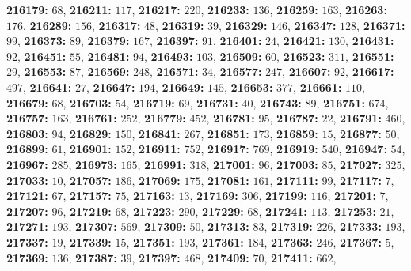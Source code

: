 \textsf{\bfseries 216179:} $68$, \textsf{\bfseries 216211:} $117$, \textsf{\bfseries 216217:} $220$, \textsf{\bfseries 216233:} $136$, \textsf{\bfseries 216259:} $163$, \textsf{\bfseries 216263:} $176$, \textsf{\bfseries 216289:} $156$, \textsf{\bfseries 216317:} $48$, \textsf{\bfseries 216319:} $39$, \textsf{\bfseries 216329:} $146$, \textsf{\bfseries 216347:} $128$, \textsf{\bfseries 216371:} $99$, \textsf{\bfseries 216373:} $89$, \textsf{\bfseries 216379:} $167$, \textsf{\bfseries 216397:} $91$, \textsf{\bfseries 216401:} $24$, \textsf{\bfseries 216421:} $130$, \textsf{\bfseries 216431:} $92$, \textsf{\bfseries 216451:} $55$, \textsf{\bfseries 216481:} $94$, \textsf{\bfseries 216493:} $103$, \textsf{\bfseries 216509:} $60$, \textsf{\bfseries 216523:} $311$, \textsf{\bfseries 216551:} $29$, \textsf{\bfseries 216553:} $87$, \textsf{\bfseries 216569:} $248$, \textsf{\bfseries 216571:} $34$, \textsf{\bfseries 216577:} $247$, \textsf{\bfseries 216607:} $92$, \textsf{\bfseries 216617:} $497$, \textsf{\bfseries 216641:} $27$, \textsf{\bfseries 216647:} $194$, \textsf{\bfseries 216649:} $145$, \textsf{\bfseries 216653:} $377$, \textsf{\bfseries 216661:} $110$, \textsf{\bfseries 216679:} $68$, \textsf{\bfseries 216703:} $54$, \textsf{\bfseries 216719:} $69$, \textsf{\bfseries 216731:} $40$, \textsf{\bfseries 216743:} $89$, \textsf{\bfseries 216751:} $674$, \textsf{\bfseries 216757:} $163$, \textsf{\bfseries 216761:} $252$, \textsf{\bfseries 216779:} $452$, \textsf{\bfseries 216781:} $95$, \textsf{\bfseries 216787:} $22$, \textsf{\bfseries 216791:} $460$, \textsf{\bfseries 216803:} $94$, \textsf{\bfseries 216829:} $150$, \textsf{\bfseries 216841:} $267$, \textsf{\bfseries 216851:} $173$, \textsf{\bfseries 216859:} $15$, \textsf{\bfseries 216877:} $50$, \textsf{\bfseries 216899:} $61$, \textsf{\bfseries 216901:} $152$, \textsf{\bfseries 216911:} $752$, \textsf{\bfseries 216917:} $769$, \textsf{\bfseries 216919:} $540$, \textsf{\bfseries 216947:} $54$, \textsf{\bfseries 216967:} $285$, \textsf{\bfseries 216973:} $165$, \textsf{\bfseries 216991:} $318$, \textsf{\bfseries 217001:} $96$, \textsf{\bfseries 217003:} $85$, \textsf{\bfseries 217027:} $325$, \textsf{\bfseries 217033:} $10$, \textsf{\bfseries 217057:} $186$, \textsf{\bfseries 217069:} $175$, \textsf{\bfseries 217081:} $161$, \textsf{\bfseries 217111:} $99$, \textsf{\bfseries 217117:} $7$, \textsf{\bfseries 217121:} $67$, \textsf{\bfseries 217157:} $75$, \textsf{\bfseries 217163:} $13$, \textsf{\bfseries 217169:} $306$, \textsf{\bfseries 217199:} $116$, \textsf{\bfseries 217201:} $7$, \textsf{\bfseries 217207:} $96$, \textsf{\bfseries 217219:} $68$, \textsf{\bfseries 217223:} $290$, \textsf{\bfseries 217229:} $68$, \textsf{\bfseries 217241:} $113$, \textsf{\bfseries 217253:} $21$, \textsf{\bfseries 217271:} $193$, \textsf{\bfseries 217307:} $569$, \textsf{\bfseries 217309:} $50$, \textsf{\bfseries 217313:} $83$, \textsf{\bfseries 217319:} $226$, \textsf{\bfseries 217333:} $193$, \textsf{\bfseries 217337:} $19$, \textsf{\bfseries 217339:} $15$, \textsf{\bfseries 217351:} $193$, \textsf{\bfseries 217361:} $184$, \textsf{\bfseries 217363:} $246$, \textsf{\bfseries 217367:} $5$, \textsf{\bfseries 217369:} $136$, \textsf{\bfseries 217387:} $39$, \textsf{\bfseries 217397:} $468$, \textsf{\bfseries 217409:} $70$, \textsf{\bfseries 217411:} $662$, 
